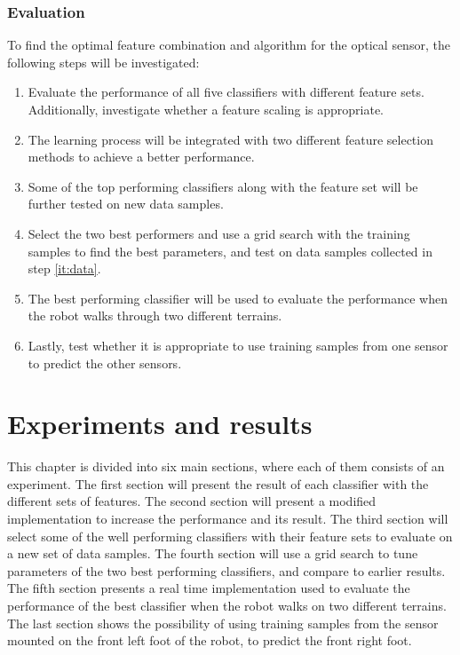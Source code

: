 \documentclass[USenglish]{ifimaster}  %
\begin{document}
\clearpage
\subsection{Evaluation}
To find the optimal feature combination and algorithm for the optical sensor, the following steps will be investigated:

\begin{enumerate}
	\item Evaluate the performance of all five classifiers with different feature sets. Additionally, investigate whether a feature scaling is appropriate.  
	\item The learning process will be integrated with two different feature selection methods to achieve a better performance. 
	\item \label{it:data} Some of the top performing classifiers along with the feature set will be further tested on new data samples.
	\item Select the two best performers and use a grid search with the training samples to find the best parameters, and test on data samples collected in step \ref{it:data}.
	\item The best performing classifier will be used to evaluate the performance when the robot walks through two different terrains.
	\item Lastly, test whether it is appropriate to use training samples from one sensor to predict the other sensors. 
\end{enumerate}


\chapter{Experiments and results}                     %
This chapter is divided into six main sections, where each of them consists of an experiment. The first section will present the result of each classifier with the different sets of features. The second section will present a modified implementation to increase the performance and its result. The third section will select some of the well performing classifiers with their feature sets to evaluate on a new set of data samples. The fourth section will use a grid search to tune parameters of the two best performing classifiers, and compare to earlier results. The fifth section presents a real time implementation used to evaluate the performance of the best classifier when the robot walks on two different terrains. The last section shows the possibility of using training samples from the sensor mounted on the front left foot of the robot, to predict the front right foot.
 
\end{document}
